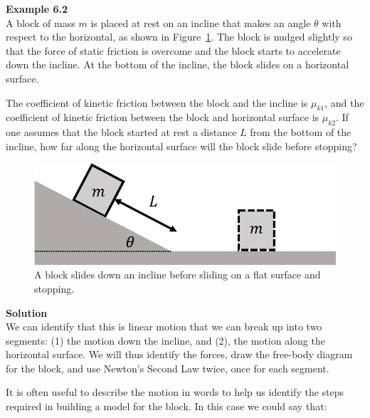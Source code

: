 \begin{framed}
\textbf{Example 6.2}\\
A block of mass $m$ is placed at rest on an incline that makes an angle $\theta$ with respect to the horizontal, as shown in Figure~\ref{fig:applyingnewtonslaws:blockI}. The block is nudged slightly so that the force of static friction is overcome and the block starts to accelerate down the incline. At the bottom of the incline, the block slides on a horizontal surface.

The coefficient of kinetic friction between the block and the incline is $\mu_{k1}$, and the coefficient of kinetic friction between the block and horizontal surface is $\mu_{k2}$. If one assumes that the block started at rest a distance $L$ from the bottom of the incline, how far along the horizontal surface will the block slide before stopping?

\begin{figure}[!htbp]
\centering
\includegraphics[width=0.5\linewidth]{files/blockI-196266707a8dcc96b8022966b7a2e44b.png}
\caption[]{A block slides down an incline before sliding on a flat surface and stopping.}
\label{fig:applyingnewtonslaws:blockI}
\end{figure}

\begin{framed}
\textbf{Solution}\\
We can identify that this is linear motion that we can break up into two segments: (1) the motion down the incline, and (2), the motion along the horizontal surface. We will thus identify the forces, draw the free-body diagram for the block, and use Newton's Second Law twice, once for each segment.

It is often useful to describe the motion in words to help us identify the steps required in building a model for the block. In this case we could say that:


\end{framed}
\end{framed}
